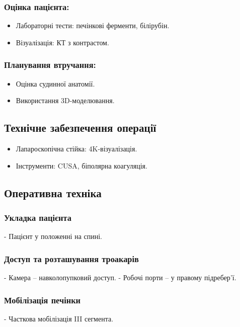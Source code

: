 \begin{refsection}
\subsubsection{Оцінка пацієнта:}
\begin{itemize}
    \item Лабораторні тести: печінкові ферменти, білірубін.
    \item Візуалізація: КТ з контрастом.
\end{itemize}

\subsubsection{Планування втручання:}
\begin{itemize}
    \item Оцінка судинної анатомії.
    \item Використання 3D-моделювання.
\end{itemize}

\subsection{Технічне забезпечення операції}
\begin{itemize}
    \item Лапароскопічна стійка: 4K-візуалізація.
    \item Інструменти: CUSA, біполярна коагуляція.
\end{itemize}

\subsection{Оперативна техніка}
\subsubsection{Укладка пацієнта}
- Пацієнт у положенні на спині.

\subsubsection{Доступ та розташування троакарів}
- Камера – навколопупковий доступ.
- Робочі порти – у правому підребер'ї.

\subsubsection{Мобілізація печінки}
- Часткова мобілізація III сегмента.


\end{refsection}
